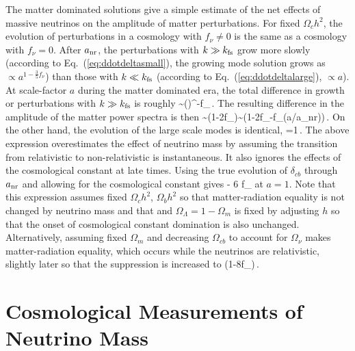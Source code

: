 The matter dominated solutions give a simple estimate of the net effects of massive neutrinos on the amplitude of matter perturbations. For fixed $\Omega_c h^2$, the evolution of perturbations in a cosmology with $f_\nu \neq 0$ is the same as a cosmology with $f_\nu =0$. After $a_{\rm nr}$, the perturbations with $k\gg k_{\rm fs}$ grow more slowly (according to Eq.~(\ref{eq:ddotdeltasmall}), the growing mode solution grows as  $\propto a^{1-\frac{3}{5}f_\nu}$) than those with $k\ll k_{\rm fs}$ (according to Eq.~(\ref{eq:ddotdeltalarge}), $\propto a$).  At scale-factor $a$ during the matter dominated era, the total difference in growth or perturbations with $k\gg k_{\rm fs}$ is roughly
\beq
{} \sim \left(\right)^{-f_\nu}\,.
\eeq
The resulting difference in the amplitude of the matter power spectra is then 
\beq
{}\sim (1-2f_\nu)\sim \left(1-2f_\nu -f_\nu\ln\left(a/a_{\rm nr}\right)\right)\,.
\eeq
On the other hand, the evolution of the large scale modes is identical,
\beq
{}=1\,.
\eeq
The above expression overestimates the effect of neutrino mass by assuming the transition from relativistic to non-relativistic is instantaneous. It also ignores the effects of the cosmological constant at late times. Using the true evolution of $\delta_{cb}$ through $a_{\rm nr}$ and allowing for the cosmological constant gives 
\beq
{} - 6 f_\nu
\eeq
at $a=1$. Note that this expression assumes fixed $\Omega_ch^2$, $\Omega_bh^2$ so that matter-radiation equality is not changed by neutrino mass and that and $\Omega_\Lambda = 1-\Omega_m$ is fixed by adjusting $h$ so that the onset of cosmological constant domination is also unchanged. Alternatively, assuming fixed $\Omega_m$ and decreasing $\Omega_{cb}$ to account for $\Omega_\nu$ makes matter-radiation equality, which occurs while the neutrinos are relativistic, slightly later so that the suppression is increased to
\beq
{} \approx (1-8f_\nu)\,.
\eeq

\section{Cosmological Measurements of Neutrino Mass} \label{sec:mnuobs}


